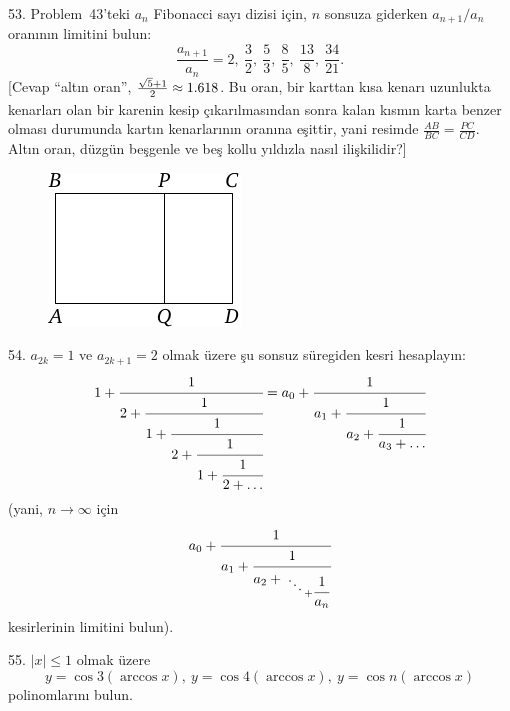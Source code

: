 \begin{problem}{53.}
Problem~43'teki  $a_n$ Fibonacci sayı dizisi için, $n$ sonsuza giderken
	$a_{n+1}/a_n$ oranının limitini bulun:\vspace{2\jot}
	\begin{equation*}
		\frac{a_{n+1}}{a_n}=2,\ \frac 32,\ \frac53, \ \frac85, \ \frac{13}8,
		\ \frac{34}{21}.
	\end{equation*}
	[Cevap \enquote{altın oran},
	$\frac{\sqrt{5}+1}{2\vphantom)} \approx 1.618$. Bu oran, bir karttan kısa kenarı uzunlukta kenarları olan bir karenin kesip çıkarılmasından sonra kalan kısmın karta  benzer olması durumunda  kartın kenarlarının oranına eşittir, yani resimde
	$\frac{AB}{BC}=\frac{PC}{CD}$. Altın oran, düzgün beşgenle ve beş kollu yıldızla nasıl ilişkilidir?]
	\begin{figure}
		\includegraphics{resources/taskbook-37}
	\end{figure}
\end{problem}

\begin{problem}{54.}
	$a_{2k}=1$ ve $a_{2k+1}=2$ olmak üzere şu sonsuz süregiden kesri hesaplayın:
	\begin{equation*}
		1+\cfrac{1}{2+\cfrac{1}{1+\cfrac{1}{2+\cfrac{1}{1+\cfrac{1}{2+\ldots}}}}}=
		a_0+\cfrac{1}{a_1+\cfrac{1}{a_2+\cfrac{1}{a_3+\dots}}}
	\end{equation*}
	 (yani, $n \to \infty$ için
	\begin{equation*}
		a_0+\cfrac{1}{a_1+\cfrac{1}{a_2+{\atop{\ddots \atop {}} + \cfrac{1}{a_n}}}}
	\end{equation*}
	kesirlerinin limitini bulun).
\end{problem}

\begin{problem}{55.}
	$|x| \leqslant 1$ olmak üzere 
	\begin{equation*}
		y=\cos 3 (\arccos x),\ y=\cos 4 (\arccos x),\
		y=\cos n (\arccos x)
	\end{equation*}
	polinomlarını bulun.
\end{problem}

